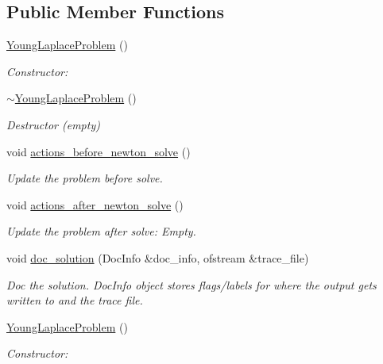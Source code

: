 \subsection*{Public Member Functions}
\begin{DoxyCompactItemize}
\item 
\hyperlink{classYoungLaplaceProblem_a4ea552f351994849e9ab597ef2da797a}{Young\+Laplace\+Problem} ()
\begin{DoxyCompactList}\small\item\em Constructor\+: \end{DoxyCompactList}\item 
\hyperlink{classYoungLaplaceProblem_aa3482606bfd86a3db9d2dec86ba75f14}{$\sim$\+Young\+Laplace\+Problem} ()
\begin{DoxyCompactList}\small\item\em Destructor (empty) \end{DoxyCompactList}\item 
void \hyperlink{classYoungLaplaceProblem_a93dd45313d28c3b9b0b51e34d14ebd24}{actions\+\_\+before\+\_\+newton\+\_\+solve} ()
\begin{DoxyCompactList}\small\item\em Update the problem before solve. \end{DoxyCompactList}\item 
void \hyperlink{classYoungLaplaceProblem_a8eed49ad1c6247cc293a584ab9262efc}{actions\+\_\+after\+\_\+newton\+\_\+solve} ()
\begin{DoxyCompactList}\small\item\em Update the problem after solve\+: Empty. \end{DoxyCompactList}\item 
void \hyperlink{classYoungLaplaceProblem_a16f10e66457718eca76d1335dbed8f12}{doc\+\_\+solution} (Doc\+Info \&doc\+\_\+info, ofstream \&trace\+\_\+file)
\begin{DoxyCompactList}\small\item\em Doc the solution. Doc\+Info object stores flags/labels for where the output gets written to and the trace file. \end{DoxyCompactList}\item 
\hyperlink{classYoungLaplaceProblem_a4ea552f351994849e9ab597ef2da797a}{Young\+Laplace\+Problem} ()
\begin{DoxyCompactList}\small\item\em Constructor\+: \end{DoxyCompactList}\item 

\end{DoxyCompactItemize}
